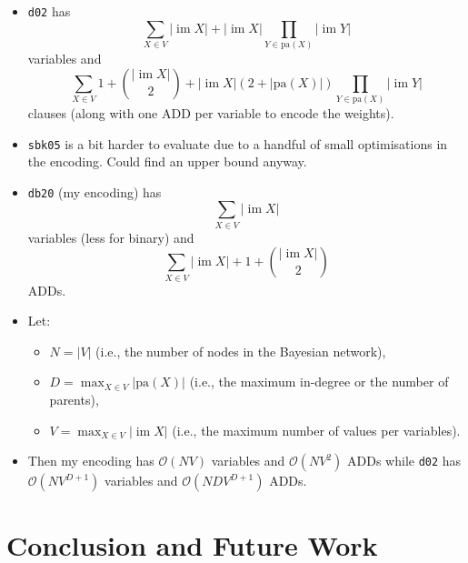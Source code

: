 \documentclass{article}
\theoremstyle{definition}
\theoremstyle{remark}
\DeclareMathOperator{\im}{im}
\begin{document}
\begin{itemize}
\item \texttt{d02} has
  \[
    \sum_{X \in V} |\im X| + |\im X|\prod_{Y \in \mathrm{pa}(X)}|\im Y|
  \]
  variables and
  \[
    \sum_{X \in V} 1 + \binom{|\im X|}{2} + |\im X|(2 +
    |\mathrm{pa}(X)|)\prod_{Y \in \mathrm{pa}(X)} |\im Y|
  \]
  clauses (along with one ADD per variable to encode the weights).
\item \texttt{sbk05} is a bit harder to evaluate due to a handful of small
  optimisations in the encoding. Could find an upper bound anyway.
\item \texttt{db20} (my encoding) has
  \[
    \sum_{X \in V} |\im X|
  \]
  variables (less for binary) and
  \[
    \sum_{X \in V} |\im X| + 1 + \binom{|\im X|}{2}
  \]
  ADDs.
\item Let:
  \begin{itemize}
  \item $N = |V|$ (i.e., the number of nodes in the Bayesian network),
  \item $D = \max_{X \in V} |\mathrm{pa}(X)|$ (i.e., the maximum in-degree or
    the number of parents),
  \item $V = \max_{X \in V} |\im X|$ (i.e., the maximum number of values per
    variables).
  \end{itemize}
\item Then my encoding has $\mathcal{O}(NV)$ variables and $\mathcal{O}(NV^2)$
  ADDs while \texttt{d02} has $\mathcal{O}(NV^{D+1})$ variables and
  $\mathcal{O}(NDV^{D+1})$ ADDs.
\end{itemize}


\section{Conclusion and Future Work}
\end{document}
